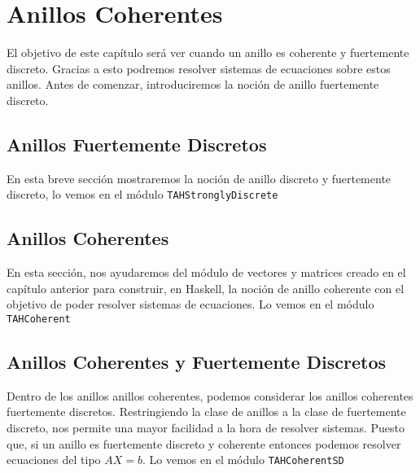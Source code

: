 \chapter{Anillos Coherentes}\label{sec:coherentHas}
El objetivo de este capítulo será ver cuando un anillo es coherente y fuertemente discreto. Gracias a esto podremos resolver sistemas de ecuaciones sobre estos anillos. Antes de comenzar, introduciremos la noción de anillo fuertemente discreto.
\section{Anillos Fuertemente Discretos}
En esta breve sección mostraremos la noción de anillo discreto y fuertemente discreto, lo vemos en el módulo \texttt{TAHStronglyDiscrete} 

\section{Anillos Coherentes}
En esta sección, nos ayudaremos del módulo de vectores y matrices creado en el capítulo anterior para construir, en Haskell, la noción de anillo coherente con el objetivo de poder resolver sistemas de ecuaciones. Lo vemos en el módulo \texttt{TAHCoherent} 

\section{Anillos Coherentes y Fuertemente Discretos }
Dentro de los anillos anillos coherentes, podemos considerar los anillos coherentes fuertemente discretos. Restringiendo la clase de anillos a la clase de fuertemente discreto, nos permite una mayor facilidad a la hora de resolver sistemas. Puesto que, si un anillo es fuertemente discreto y coherente entonces podemos resolver ecuaciones del tipo $AX=b$. Lo vemos en el módulo \texttt{TAHCoherentSD} 


